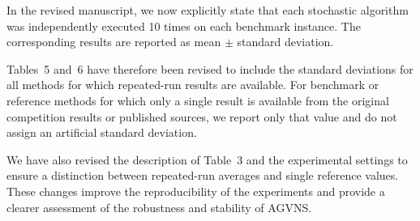 \documentclass[11pt]{article}
\begin{document}
In the revised manuscript, we now explicitly state that each stochastic algorithm was independently executed 10 times on each benchmark instance. The corresponding results are reported as mean $\pm$ standard deviation.

Tables~5 and~6 have therefore been revised to include the standard deviations for all methods for which repeated-run results are available. For benchmark or reference methods for which only a single result is available from the original competition results or published sources, we report only that value and do not assign an artificial standard deviation.

We have also revised the description of Table~3 and the experimental settings to ensure a  distinction between repeated-run averages and single reference values. These changes improve the reproducibility of the experiments and provide a clearer assessment of the robustness and stability of AGVNS.
\end{document}
